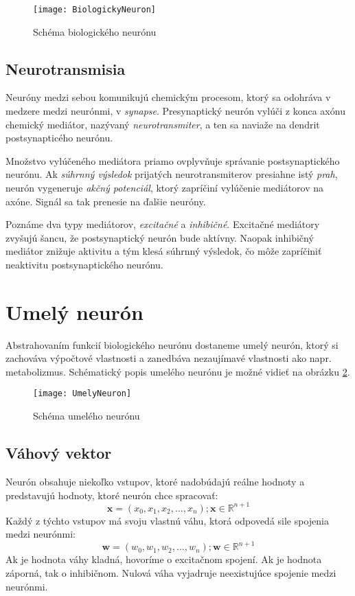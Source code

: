\begin{figure}[h]
  \centering
  \texttt{[image: BiologickyNeuron]}
  \caption{Schéma biologického neurónu}
  \label{fig:BiologickyNeuron}
\end{figure}

\subsection{Neurotransmisia}

Neuróny medzi sebou komunikujú chemickým procesom, ktorý sa odohráva v medzere medzi neurónmi, v \emph{synapse}. Presynaptický neurón vylúči z konca axónu chemický mediátor, nazývaný \emph{neurotransmiter}, a ten sa naviaže na dendrit postsynapticého neurónu.

Množstvo vylúčeného mediátora priamo ovplyvňuje správanie postsynaptického neurónu. Ak \emph{súhrnný výsledok} prijatých neurotransmiterov presiahne istý \emph{prah}, neurón vygeneruje \emph{akčný potenciál}, ktorý zapríčiní vylúčenie mediátorov na axóne. Signál sa tak prenesie na ďalšie neuróny.

Poznáme dva typy mediátorov, \emph{excitačné} a \emph{inhibičné}. Excitačné mediátory zvyšujú šancu, že postsynaptický neurón bude aktívny. Naopak inhibičný mediátor znižuje aktivitu a tým klesá súhrnný výsledok, čo môže zapríčiniť neaktivitu postsynaptického neurónu.

\section{Umelý neurón}

Abstrahovaním funkcií biologického neurónu dostaneme umelý neurón, ktorý si zachováva výpočtové vlastnosti a zanedbáva nezaujímavé vlastnosti ako napr. metabolizmus. Schématický popis umelého neurónu je možné vidieť na obrázku \ref{fig:UmelyNeuron}.

\begin{figure}[H]
  \centering
  \texttt{[image: UmelyNeuron]}
  \caption{Schéma umelého neurónu}
  \label{fig:UmelyNeuron}
\end{figure}

\subsection{Váhový vektor}

Neurón obsahuje niekoľko vstupov, ktoré nadobúdajú reálne hodnoty a predstavujú hodnoty, ktoré neurón chce spracovať:
\[
\mathbf{x} = (x_0, x_1, x_2, \ldots, x_n); \mathbf{x} \in \mathbb{R}^{n+1}
\]
Každý z týchto vstupov má svoju vlastnú váhu, ktorá odpovedá sile spojenia medzi neurónmi:
\[
\mathbf{w} = (w_0, w_1, w_2, \ldots, w_n); \mathbf{w} \in \mathbb{R}^{n+1}
\]
Ak je hodnota váhy kladná, hovoríme o excitačnom spojení. Ak je hodnota záporná, tak o inhibičnom. Nulová váha vyjadruje neexistujúce spojenie medzi neurónmi.

